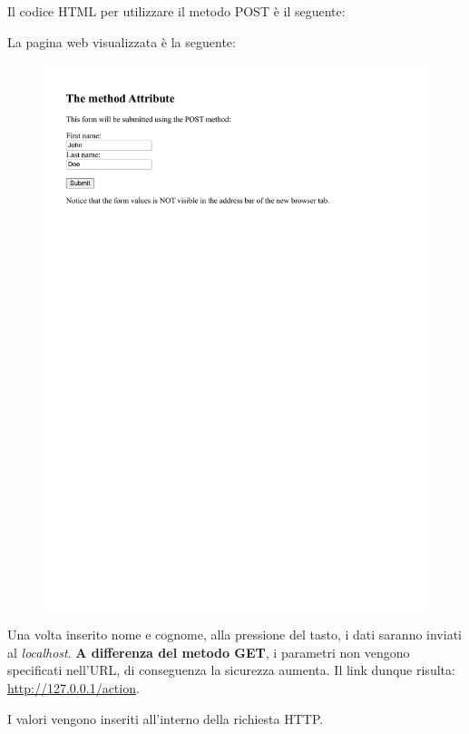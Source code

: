 \documentclass[a4paper]{article}
\begin{document}
	Il codice HTML per utilizzare il metodo POST è il seguente:
	
	La pagina web visualizzata è la seguente:
	\begin{figure}[!htp]
		\centering
		\includegraphics[width=\textwidth]{img/form-post.pdf}
	\end{figure}
	
	\noindent
	Una volta inserito nome e cognome, alla pressione del tasto, i dati saranno inviati al \emph{localhost}. \textbf{A differenza del metodo GET}, i parametri non vengono specificati nell'URL, di conseguenza la sicurezza aumenta. Il link dunque risulta: \url{http://127.0.0.1/action}.\newline
	
	\noindent
	I valori vengono inseriti all'interno della richiesta HTTP.\newpage
	
\end{document}
